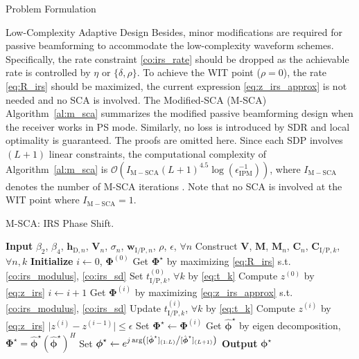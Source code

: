 \documentclass[journal,12pt,onecolumn,draftclsnofoot]{IEEEtran}
\begin{document}
\begin{section}{Problem Formulation}
\begin{subsection}{Low-Complexity Adaptive Design}
			Besides, minor modifications are required for passive beamforming to accommodate the low-complexity waveform schemes. Specifically, the rate constraint \eqref{co:irs_rate} should be dropped as the achievable rate is controlled by $\eta$ or $\{\delta,\rho\}$. To achieve the WIT point ($\rho=0$), the rate \eqref{eq:R_irs} should be maximized, the current expression \eqref{eq:z_irs_approx} is not needed and no SCA is involved. The Modified-SCA (M-SCA) Algorithm~\ref{al:m_sca} summarizes the modified passive beamforming design when the receiver works in PS mode. Similarly, no loss is introduced by SDR and local optimality is guaranteed. The proofs are omitted here. Since each SDP involves $(L+1)$ linear constraints, the computational complexity of Algorithm~\ref{al:m_sca} is $\mathcal{O}\left(I_{\mathrm{M-SCA}}(L+1)^{4.5} \log(\epsilon_{\mathrm{IPM}}^{-1})\right)$, where $I_{\mathrm{M-SCA}}$ denotes the number of M-SCA iterations \cite{Luo2010}. Note that no SCA is involved at the WIT point where $I_{\mathrm{M-SCA}}=1$.

			\begin{algorithm}[!t]
				\caption{M-SCA: IRS Phase Shift.}
				\label{al:m_sca}
				\begin{algorithmic}[1]
					\State \textbf{Input} $\beta_2$, $\beta_4$, $\boldsymbol{h}_{\mathrm{D},n}$, $\boldsymbol{V}_{n}$, $\sigma_n$, $\boldsymbol{w}_{\mathrm{I/P},n}$, $\rho$, $\epsilon$, $\forall n$
					\State Construct $\boldsymbol{V}$, $\boldsymbol{M}$, $\boldsymbol{M}_n$, $\boldsymbol{C}_{n}$, $\boldsymbol{C}_{\mathrm{I/P},k}$, $\forall n,k$
					\State \textbf{Initialize} $i \gets 0$, $\boldsymbol{\Phi}^{(0)}$
						\State Get $\boldsymbol{\Phi}^{\star}$ by maximizing \eqref{eq:R_irs} s.t. \eqref{co:irs_modulus}, \eqref{co:irs_sd}
					\Else
						\State Set $t_{\mathrm{I/P},k}^{(0)}$, $\forall k$ by \eqref{eq:t_k}
						\State Compute $z^{(0)}$ by \eqref{eq:z_irs}
						\Repeat
							\State $i \gets i + 1$
								\State Get $\boldsymbol{\Phi}^{(i)}$ by maximizing \eqref{eq:z_irs_approx} s.t. \eqref{co:irs_modulus}, \eqref{co:irs_sd}
								\State Update $t_{\mathrm{I/P},k}^{(i)}$, $\forall k$ by \eqref{eq:t_k}
								\State Compute $z^{(i)}$ by \eqref{eq:z_irs}
						\Until $\lvert z^{(i)}-z^{(i-1)} \rvert \le \epsilon$
						\State Set $\boldsymbol{\Phi}^{\star} \gets \boldsymbol{\Phi}^{(i)}$
					\EndIf
					\State Get $\hat{\boldsymbol{\phi}}^\star$ by eigen decomposition, $\boldsymbol{\Phi}^{\star}=\hat{\boldsymbol{\phi}}^\star(\hat{\boldsymbol{\phi}}^\star)^H$
					\State Set $\boldsymbol{\phi}^{\star} \gets e^{j \arg\left([\hat{\boldsymbol{\phi}}^\star]_{(1:L)} \middle/ [\hat{\boldsymbol{\phi}}^\star]_{(L+1)}\right)}$
					\State \textbf{Output} $\boldsymbol{\phi}^{\star}$
				\end{algorithmic}
			\end{algorithm}
		\end{subsection}



\end{section}
\end{document}
